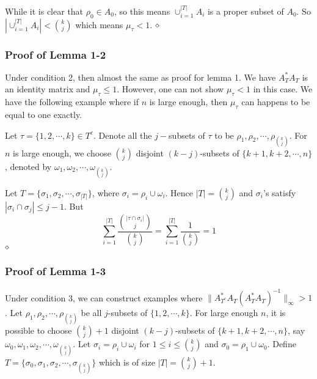 \documentclass{article}
\begin{document}
While it is clear that $\rho_0\in A_0$, so this means $\cup_{i=1}^{|T|}A_i$ is a proper subset of 
$A_0$. So $|\cup_{i=1}^{|T|} A_i|< {k\choose j}$ which means $\mu_\tau<1$. 
$\hfill\diamond$

\subsubsection{Proof of Lemma 1-2}
Under condition 2, then almost the same as proof for lemma 1. We have 
$A^*_TA_T$ is an identity matrix and $\mu_\tau\le 1$. However, one can not show $\mu_\tau<1$ in
this case. We have the following example where if $n$ is large enough, then 
$\mu_\tau$ can happens to be equal to one exactly. 

Let $\tau=\{1,2,\cdots,k\}\in T^c$. Denote all the $j-$subsets of $\tau$
to be $\rho_1, \rho_2, \cdots, \rho_{{k\choose j}}$. For $n$ is large enough, we choose $k \choose j$ disjoint $(k-j)$-subsets of $\{k+1, k+2, \cdots, n\}$, denoted by $\omega_1, \omega_2, \cdots, \omega_
{{k\choose j}}$. 

Let $T=\{\sigma_1, \sigma_2, \cdots, \sigma_{|T|}\}$, where $\sigma_i=\rho_i\cup\omega_i$. Hence $|T|={k\choose j}$ and  
$\sigma_i$'s satisfy $|\sigma_i\cap\sigma_j|\le j-1$. But 
$$\sum_{i=1}^{|T|}\frac{{|\tau\cap\sigma_i|\choose j}}{{k\choose j}}=\sum_{i=1}^{|T|}\frac{1}{{k\choose j}}=1$$
$\hfill\diamond$


\subsubsection{Proof of Lemma 1-3}
Under condition 3, we can construct examples where $\|A^*_{T^c}A_T(A^*_TA_T)^{-1}\|_\infty>1$. 
Let $\rho_1, \rho_2, \cdots, \rho_{{k\choose j}}$ be all $j$-subsets of $\{1,2,\cdots, k\}$. For large enough $n$, it is possible to choose ${k\choose j }+1$ disjoint $(k-j)$-subsets of $\{k+1, k+2, \cdots, n\}$, say
$\omega_0, \omega_1, \omega_2, \cdots, \omega_
{{k\choose j}}$. Let $\sigma_i=\rho_i\cup \omega_i$ for $1\leq i \leq {k\choose j}$ and $\sigma_0=\rho_1\cup \omega_{0}$. Define $T= \{\sigma_0, \sigma_1, \sigma_2, \cdots, \sigma_{{k\choose j}}\}$ which is of size $|T|={k\choose j}+1$. 
\end{document}
